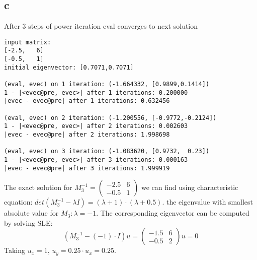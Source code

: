 \subsection*{c}
After 3 steps of power iteration eval converges to next solution
\begin{verbatim}
input matrix:
[-2.5,   6]
[-0.5,   1]
initial eigenvector: [0.7071,0.7071]

(eval, evec) on 1 iteration: (-1.664332, [0.9899,0.1414])
1 - |<evec@pre, evec>| after 1 iterations: 0.200000
|evec - evec@pre| after 1 iterations: 0.632456

(eval, evec) on 2 iteration: (-1.200556, [-0.9772,-0.2124])
1 - |<evec@pre, evec>| after 2 iterations: 0.002603
|evec - evec@pre| after 2 iterations: 1.998698

(eval, evec) on 3 iteration: (-1.083620, [0.9732,  0.23])
1 - |<evec@pre, evec>| after 3 iterations: 0.000163
|evec - evec@pre| after 3 iterations: 1.999919
\end{verbatim}
The exact solution for $M_3^{-1} = 
\begin{pmatrix}
	-2.5 & 6\\
	-0.5 & 1
\end{pmatrix}
$ we can find using characteristic equation: $det(M_3^{-1} - \lambda I) = (\lambda + 1)\cdot (\lambda + 0.5)$.
the eigenvalue with smallest absolute value for $M_3: \lambda = -1$. The corresponding eigenvector can be computed by solving SLE:
\begin{equation}
		(M_3^{-1} - (-1)\cdot I)u = 
		\begin{pmatrix}
			-1.5 & 6\\
			-0.5 & 2
		\end{pmatrix}
		u = 0
\end{equation}
Taking $u_x = 1$, $u_y = 0.25\cdot u_x = 0.25$.
